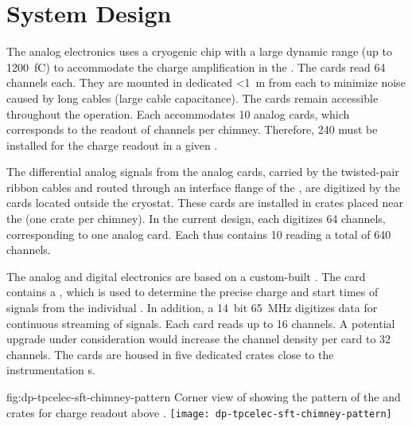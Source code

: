\section{System Design}
\label{sec:dp-tpcelec-design}

The   analog electronics uses a cryogenic  chip with a large dynamic range (up to \SI{1200}{\femto\coulomb}) to accommodate the charge amplification in the . The  cards read \num{64}  channels each. They are mounted in dedicated   \SI{<1}{\metre} from each  to minimize noise caused by long cables (large cable capacitance). The cards remain accessible throughout the  operation. Each  accommodates \num{10}  analog cards, which corresponds to the readout of %
\dpchperchimney {} channels per chimney. Therefore, \num{240}  must be installed for the charge readout in a given .   

The differential analog signals from the analog  cards, carried by the twisted-pair ribbon cables and routed through an interface flange of the , are digitized by the  cards located outside the cryostat. These cards are installed in  crates placed near the  (one crate per chimney). In the current design, each  digitizes \num{64} channels, corresponding to one  analog card. Each  thus contains \num{10}  reading a total of \num{640} channels. 

The   analog and digital electronics are based on a custom-built . The card contains a   \cite{Blin:2017}, which is used to determine the precise charge and start times of signals from the %
individual . In addition, a \SI{14}{bit} \SI{65}{MHz}  digitizes data for continuous streaming of  signals. Each card reads up to \num{16} channels. %
A potential upgrade under consideration would increase the channel density per card to \num{32} channels. The  cards are housed in five dedicated  crates close to the  instrumentation \fdth{}s.

\begin{dunefigure}{fig:dp-tpcelec-sft-chimney-pattern}
{Corner view of  showing the pattern of the  and  crates for charge readout above .}
\texttt{[image: dp-tpcelec-sft-chimney-pattern]}
\end{dunefigure}

